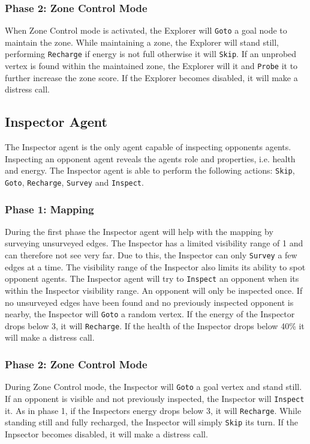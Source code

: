 \documentclass[11pt]{article}
\begin{document}
\subsubsection*{Phase 2: Zone Control Mode}
When Zone Control mode is activated, the Explorer will {\tt Goto} a goal node to maintain the zone. While maintaining a zone, the Explorer will stand still, performing {\tt Recharge} if energy is not full otherwise it will {\tt Skip}. If an unprobed vertex is found within the maintained zone, the Explorer will {\Goto} it and {\tt Probe} it to further increase the zone score. If the Explorer becomes disabled, it will make a distress call.

\subsection{Inspector Agent}
The Inspector agent is the only agent capable of inspecting opponents agents. Inspecting an opponent agent reveals the agents role and properties, i.e. health and energy. The Inspector agent is able to perform the following actions: {\tt Skip}, {\tt Goto}, {\tt Recharge}, {\tt Survey} and {\tt Inspect}.

\subsubsection*{Phase 1: Mapping}
During the first phase the Inspector agent will help with the mapping by surveying unsurveyed edges. The Inspector has a limited visibility range of 1 and can therefore not see very far. Due to this, the Inspector can only {\tt Survey} a few edges at a time. The visibility range of the Inspector also limits its ability to spot opponent agents. The Inspector agent will try to {\tt Inspect} an opponent when its within the Inspector visibility range. An opponent will only be inspected once. If no unsurveyed edges have been found and no previously inspected opponent is nearby, the Inspector will {\tt Goto} a random vertex. If the energy of the Inspector drops below 3, it will {\tt Recharge}. If the health of the Inspector drops below 40\% it will make a distress call.

\subsubsection*{Phase 2: Zone Control Mode}
During Zone Control mode, the Inspector will {\tt Goto} a goal vertex and stand still. If an opponent is visible and not previously inspected, the Inspector will {\tt Inspect} it. As in phase 1, if the Inspectors energy drops below 3, it will {\tt Recharge}. While standing still and fully recharged, the Inspector will simply {\tt Skip} its turn. If the Inpsector becomes disabled, it will make a distress call.
\end{document}

